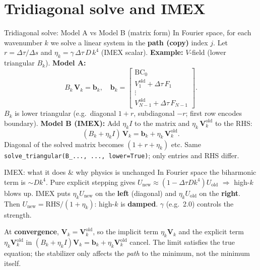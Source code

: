 \documentclass{beamer}
\begin{document}
\section{Tridiagonal solve and IMEX}
\begin{frame}{Tridiagonal solve: Model A vs Model B (matrix form)}
    In Fourier space, for each wavenumber $k$ we solve a linear system in the \textbf{path (copy)} index $j$. Let $r = \Delta\tau/\Delta s$ and $\eta_k = \gamma\,\Delta\tau\,D\,k^4$ (IMEX scalar).
    \vspace{0.4em}
    \textbf{Example:} $V$-field (lower triangular $B_k$). \textbf{Model A:}
    \[
    B_k\,\mathbf{V}_k = \mathbf{b}_k,
    \quad
    \mathbf{b}_k = \begin{bmatrix} \mathrm{BC}_0 \\ V_1^{\mathrm{old}} + \Delta\tau\,F_1 \\ \vdots \\ V_{N-1}^{\mathrm{old}} + \Delta\tau\,F_{N-1} \end{bmatrix}.
    \]
    $B_k$ is lower triangular (e.g.\ diagonal $1+r$, subdiagonal $-r$; first row encodes boundary). 
    \vspace{0.3em}
    \textbf{Model B (IMEX):} Add $\eta_k I$ to the matrix and $\eta_k\,\mathbf{V}_k^{\mathrm{old}}$ to the RHS:
    \[
    (B_k + \eta_k I)\,\mathbf{V}_k = \mathbf{b}_k + \eta_k\,\mathbf{V}_k^{\mathrm{old}}.
    \]
    Diagonal of the solved matrix becomes $(1+r+\eta_k)$ etc. Same \texttt{solve\_triangular(B\_..., ..., lower=True)}; only entries and RHS differ.
\end{frame}

\begin{frame}{IMEX: what it does \& why physics is unchanged}
    In Fourier space the biharmonic term is $\sim D k^4$. Pure explicit stepping gives $U_{\mathrm{new}} \approx (1 - \Delta\tau D k^4) U_{\mathrm{old}}$ $\Rightarrow$ high-$k$ blows up. IMEX puts $\eta_k U_{\mathrm{new}}$ on the \textbf{left} (diagonal) and $\eta_k U_{\mathrm{old}}$ on the \textbf{right}. Then $U_{\mathrm{new}} = \mathrm{RHS}/(1+\eta_k)$: high-$k$ is \textbf{damped}. $\gamma$ (e.g.\ 2.0) controls the strength.
    \vspace{0.5em}

    At \textbf{convergence}, $\mathbf{V}_k = \mathbf{V}_k^{\mathrm{old}}$, so the implicit term $\eta_k\mathbf{V}_k$ and the explicit term $\eta_k\mathbf{V}_k^{\mathrm{old}}$ in $(B_k+\eta_k I)\mathbf{V}_k = \mathbf{b}_k + \eta_k\mathbf{V}_k^{\mathrm{old}}$ cancel. The limit satisfies the true equation; the stabilizer only affects the \emph{path} to the minimum, not the minimum itself.
\end{frame}
\end{document}
